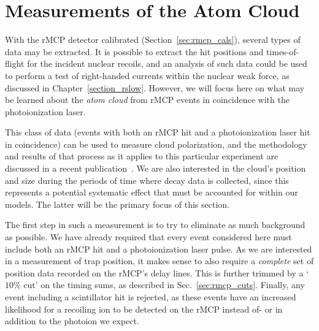 
\section{Measurements of the Atom Cloud}
\label{sec:cloud_calibration}
With the rMCP detector calibrated (Section~\ref{sec:rmcp_cals}), several types of data may be extracted.  It is possible to extract the hit positions and times-of-flight for the incident nuclear recoils, and an analysis of such data could be used to perform a test of right-handed currents within the nuclear weak force, as discussed in Chapter~\ref{section_rslow}.  However, we will focus here on what may be learned about the \emph{atom cloud} from rMCP events in coincidence with the photoionization laser.~  

This class of data (events with both an rMCP hit and a photoionization laser hit in coincidence) can be used to measure cloud polarization, and the methodology and results of that process as it applies to this particular experiment are discussed in a recent publication~\cite{ben_OP}.  We are also interested in the cloud's position and size during the periods of time where decay data is collected, since this represents a potential systematic effect that must be accounted for within our models.  The latter will be the primary focus of this section.  

The first step in such a measurement is to try to eliminate as much background as possible.  We have already required that every event considered here must include both an rMCP hit and a photoionization laser pulse.  As we are interested in a measurement of trap position, it makes sense to also require a \emph{complete} set of position data recorded on the rMCP's delay lines.   This is further trimmed by a `$10\%$ cut' on the timing sums, as described in Sec.~\ref{sec:rmcp_cuts}.  Finally, any event including a scintillator hit is rejected, as these events have an increased likelihood for a recoiling ion to be detected on the rMCP instead of- or in addition to the photoion we expect.  


